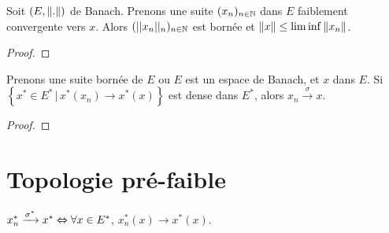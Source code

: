\begin{corollary}
	Soit $(E, \norm{.})$ de Banach.
	Prenons une suite $(x_{n})_{n \in \mathbb{N}}$ dans $E$ faiblement
	convergente vers $x$.
	Alors $(||x_{n}||_{n})_{n \in \mathbb{N}}$ est bornée et $\norm{x} \leq
	\lim\inf \norm{x_{n}}$.
\end{corollary}

\ifdefined\outputproof
\begin{proof}

\end{proof}
\fi

\begin{proposition}
	Prenons une suite bornée de $E$ ou $E$ est un espace de Banach, et $x$ dans
	$E$.
	Si $\left\{ x^{*} \in E^{*} \, | \, x^{*}(x_{n}) \rightarrow x^{*}(x)
\right\}$ est dense dans $E^{*}$, alors $x_{n} \xrightarrow{\sigma} x$.
\end{proposition}

\ifdefined\outputproof
\begin{proof}

\end{proof}
\fi

\section{Topologie pré-faible}


\begin{proposition}
	$x^{*}_{n} \xrightarrow{\sigma^{*}} x^{*} \Leftrightarrow \forall x \in E^{*}$,
	$x^{*}_{n}(x) \rightarrow x^{*}(x)$.
\end{proposition}
